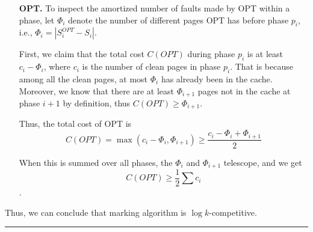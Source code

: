 \documentclass[11pt]{article}
\newenvironment{proof}{{\bf Proof:  }}{\hfill\rule{2mm}{2mm}}
\begin{document}
\begin{proof}
\begin{enumerate}[itemindent=1em]
		\item [{\bf OPT. }] To inspect the amortized number of faults made by OPT within a phase, let $\Phi_i$ denote the number of different pages OPT has before phase $p_i$, i.e., $\Phi_i=|S_i^{OPT}-S_i|$.
		
		First, we claim that the total cost $C(OPT)$ during phase $p_i$ is at least $c_i-\Phi_i$, where $c_i$ is the number of clean pages in phase $p_i$. That is because among all the clean pages, at most $\Phi_i$ has already been in the cache. Moreover, we know that there are at least $\Phi_{i+1}$ pages not in the cache at phase $i+1$ by definition, thus $C(OPT)\ge \Phi_{i+1}$.
		
		Thus, the total cost of OPT is
		$$C(OPT)=\max{(c_i-\Phi_i, \Phi_{i+1})}\ge\frac{c_i-\Phi_i+\Phi_{i+1}}{2}$$
		
		When this is summed over all phases, the $\Phi_i$ and $\Phi_{i+1}$ telescope, and we get $$C(OPT)\ge \frac{1}{2}\sum{c_i}$$.
	\end{enumerate}
	Thus, we can conclude that marking algorithm is $\log k$-competitive.
	
	
\end{proof}



\end{document}
